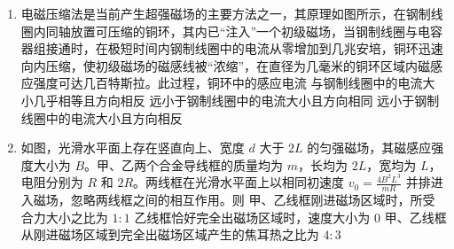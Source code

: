 \documentclass[\gkver]{gaokaozhenti}
\begin{document}
\begin{enumerate}
\item
电磁压缩法是当前产生超强磁场的主要方法之一，其原理如图所示，在钢制线圈内同轴放置可压缩的铜环，其内已“注入”一个初级磁场，当钢制线圈与电容器组接通时，在极短时间内钢制线圈中的电流从零增加到几兆安培，铜环迅速向内压缩，使初级磁场的磁感线被“浓缩”，在直径为几毫米的铜环区域内磁感应强度可达几百特斯拉。此过程，铜环中的感应电流
{与钢制线圈中的电流大小几乎相等且方向相反}
{远小于钢制线圈中的电流大小且方向相同}
{远小于钢制线圈中的电流大小且方向相反}

\item
如图，光滑水平面上存在竖直向上、宽度 $d$ 大于 $2L$ 的匀强磁场，其磁感应强度大小为 $B$。甲、乙两个合金导线框的质量均为 $m$，长均为 $2L$，宽均为 $L$，电阻分别为 $R$ 和 $2R$。两线框在光滑水平面上以相同初速度 $v_{0} = \frac{4B^{2}L^{3}}{mR}$ 并排进入磁场，忽略两线框之间的相互作用。则
{甲、乙线框刚进磁场区域时，所受合力大小之比为 $1:1$}
{乙线框恰好完全出磁场区域时，速度大小为 $0$}
{甲、乙线框从刚进磁场区域到完全出磁场区域产生的焦耳热之比为 $4:3$}
\end{enumerate}
\end{document}

